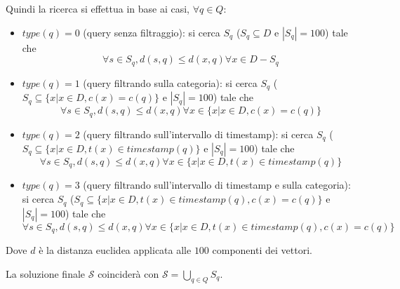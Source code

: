 Quindi la ricerca si effettua in base ai casi, $\forall q\in Q$:
\begin{itemize}
    \item $type(q) = 0$ (query senza filtraggio): si cerca $S_q$ ($S_q \subseteq D$ 
    e $|S_q| = 100$) tale che 
    $$\forall s \in S_q, d(s, q) \le d(x, q) \forall x \in D - S_q$$  
    \item $type(q) = 1$ (query filtrando sulla categoria): si cerca $S_q$ ($S_q \subseteq \{x| x\in D, c(x) = c(q)\}$ 
    e $|S_q| = 100$) tale che 
    $$\forall s \in S_q, d(s, q) \le d(x, q) \forall x \in \{x| x\in D, c(x) = c(q)\}$$  
    \item $type(q) = 2$ (query filtrando sull'intervallo di timestamp): si cerca 
    $S_q$ ($S_q \subseteq \{x| x\in D, t(x) \in timestamp(q)\}$ 
    e $|S_q| = 100$) tale che 
    $$\forall s \in S_q, d(s, q) \le d(x, q) \forall x \in \{x| x\in D, t(x) \in timestamp(q)\}$$  
    \item $type(q) = 3$ (query filtrando sull'intervallo di timestamp e sulla categoria): si cerca 
    $S_q$ ($S_q \subseteq \{x| x\in D, t(x) \in timestamp(q),  c(x) = c(q)\}$ 
    e $|S_q| = 100$) tale che 
    $$\forall s \in S_q, d(s, q) \le d(x, q) \forall x \in \{x| x\in D, t(x) \in timestamp(q), c(x) = c(q)\}$$  
\end{itemize}
Dove $d$ è la distanza euclidea applicata alle $100$ componenti dei vettori.
 
La soluzione finale $\mathcal{S}$ coinciderà con $ \mathcal{S} = \bigcup_{q\in Q} S_q$.

